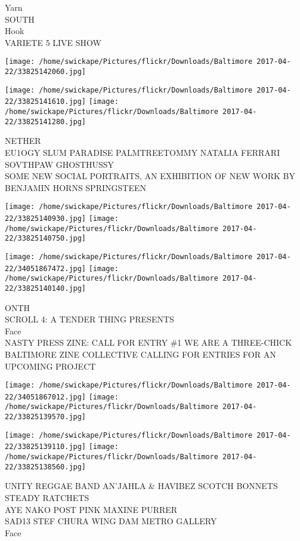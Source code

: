 \documentclass[10pt,letterpaper]{article}
\begin{document}
Yarn\\
SOUTH\\
Hook\\
VARIETE 5 LIVE SHOW
\pagebreak

\texttt{[image: /home/swickape/Pictures/flickr/Downloads/Baltimore 2017-04-22/33825142060.jpg]}

\vspace{0.25in}
\texttt{[image: /home/swickape/Pictures/flickr/Downloads/Baltimore 2017-04-22/33825141610.jpg]}
\texttt{[image: /home/swickape/Pictures/flickr/Downloads/Baltimore 2017-04-22/33825141280.jpg]}

NETHER\\
EU1OGY SLUM PARADISE PALMTREETOMMY NATALIA FERRARI SOVTHPAW GHOSTHUSSY\\
SOME NEW SOCIAL PORTRAITS, AN EXHIBITION OF NEW WORK BY BENJAMIN HORNS SPRINGSTEEN
\pagebreak

\texttt{[image: /home/swickape/Pictures/flickr/Downloads/Baltimore 2017-04-22/33825140930.jpg]}
\texttt{[image: /home/swickape/Pictures/flickr/Downloads/Baltimore 2017-04-22/33825140750.jpg]}

\texttt{[image: /home/swickape/Pictures/flickr/Downloads/Baltimore 2017-04-22/34051867472.jpg]}
\texttt{[image: /home/swickape/Pictures/flickr/Downloads/Baltimore 2017-04-22/33825140140.jpg]}

ONTH\\
SCROLL 4: A TENDER THING PRESENTS\\
Face\\
NASTY PRESS ZINE: CALL FOR ENTRY \#1 WE ARE A THREE{-}CHICK BALTIMORE ZINE COLLECTIVE CALLING FOR ENTRIES FOR AN UPCOMING PROJECT
\pagebreak

\texttt{[image: /home/swickape/Pictures/flickr/Downloads/Baltimore 2017-04-22/34051867012.jpg]}
\texttt{[image: /home/swickape/Pictures/flickr/Downloads/Baltimore 2017-04-22/33825139570.jpg]}

\texttt{[image: /home/swickape/Pictures/flickr/Downloads/Baltimore 2017-04-22/33825139110.jpg]}
\texttt{[image: /home/swickape/Pictures/flickr/Downloads/Baltimore 2017-04-22/33825138560.jpg]}

UNITY REGGAE BAND AN'JAHLA \& HAVIBEZ SCOTCH BONNETS STEADY RATCHETS\\
AYE NAKO POST PINK MAXINE PURRER\\
SAD13 STEF CHURA WING DAM METRO GALLERY\\
Face
\pagebreak
\end{document}

